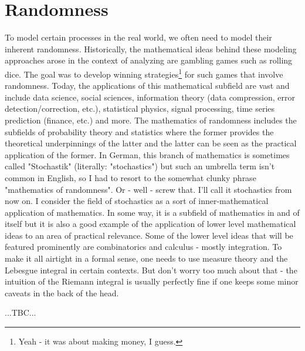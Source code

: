 \chapter{Randomness}
To model certain processes in the real world, we often need to model their inherent randomness. Historically, the mathematical ideas behind these modeling approaches arose in the context of analyzing are gambling games such as rolling dice. The goal was to develop winning strategies\footnote{Yeah - it was about making money, I guess.} for such games that involve randomness. Today, the applications of this mathematical subfield are vast and include data science, social sciences, information theory (data compression, error detection/correction, etc.), statistical physics, signal processing, time series prediction (finance, etc.) and more. The mathematics of randomness includes the subfields of probability theory and statistics where the former provides the theoretical underpinnings of the latter and the latter can be seen as the practical application of the former. In German, this branch of mathematics is sometimes called "Stochastik" (literally: "stochastics") but such an umbrella term isn't common in English, so I had to resort to the somewhat clunky phrase "mathematics of randomness". Or - well - screw that. I'll call it stochastics from now on. I consider the field of stochastics as a sort of inner-mathematical application of mathematics. In some way, it is a subfield of mathematics in and of itself but it is also a good example of the application of lower level mathematical ideas to an area of practical relevance. Some of the lower level ideas that will be featured prominently are combinatorics and calculus - mostly integration. To make it all airtight in a formal sense, one needs to use measure theory and the Lebesgue integral in certain contexts. But don't worry too much about that - the intuition of the Riemann integral is usually perfectly fine if one keeps some minor caveats in the back of the head.

...TBC...



\begin{comment}
-In German, we use the term "stochastics" as umbrella term for the mathematics of randomness. The
 field includes probability theory and statistics

ToDo:
- Random Processes (Markov chains, etc.)

\end{comment}